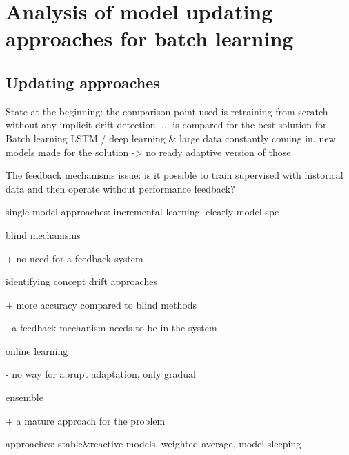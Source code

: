 

\chapter{Analysis of model updating approaches for batch learning}

\section{Updating approaches}

State at the beginning: the comparison point used is retraining from scratch without any implicit drift detection. ... is compared for the best solution for Batch learning LSTM / deep learning
& large data constantly coming in. new models made for the solution -> no ready adaptive version of those

The feedback mechanisms issue: is it possible to train supervised with historical data and then operate without performance feedback?

single model approaches: incremental learning. clearly model-spe


blind mechanisms

+ no need for a feedback system

identifying concept drift approaches

+ more accuracy compared to blind methods \cite{conceptdriftsurvey}

- a feedback mechanism needs to be in the system

online learning

- no way for abrupt adaptation, only gradual \cite{conceptdriftsurvey}

ensemble

+ a mature approach for the problem \cite{mlforstreamingsurvey}

approaches: stable&reactive models, weighted average, model sleeping \cite{conceptdriftsurvey}

